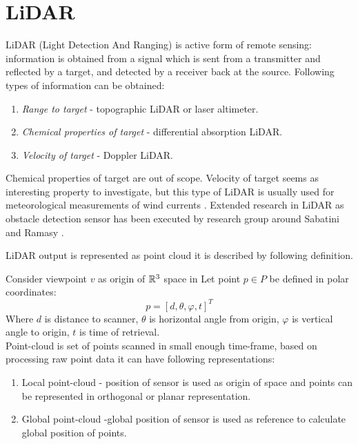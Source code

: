 \section{LiDAR}
\noindent LiDAR (Light Detection And Ranging) is active form of remote sensing: information is obtained from a signal which is sent from a transmitter and reflected by a target, and detected by a receiver back at the source. Following types of information can be obtained:
\begin{enumerate}
\item \textit{Range to target} - topographic LiDAR or laser altimeter.
\item \textit{Chemical properties of target} - differential absorption LiDAR.
\item \textit{Velocity of target} - Doppler LiDAR.
\end{enumerate}

\noindent Chemical properties of target are out of scope. Velocity of  target seems as interesting property to investigate, but this type of LiDAR is usually used for meteorological measurements of wind currents \cite{martin2011meteorological}. Extended research in LiDAR as obstacle detection sensor has been executed by research group around Sabatini \cite{sabatini2014lidar} and Ramasy \cite{ramasamy2016lidar}. 

LiDAR output is represented as point cloud it is described by following definition.
\begin{definition}
Consider viewpoint $v$ as origin of $\mathbb{R}^3$ space in 
Let point $p \in P$ be defined in polar coordinates:
\begin{equation}
    p= [ d, \theta, \varphi, t ]^T
\end{equation}
Where $d$ is distance to scanner, $\theta$ is horizontal angle from origin, $\varphi$ is vertical angle to origin, $t$ is time of retrieval.\\

\noindent Point-cloud is set of points scanned in small enough time-frame, based on processing raw point data it can have following representations:
\begin{enumerate}
\item Local point-cloud - position of sensor is used as origin of space and points can be represented in orthogonal or planar representation. 
\item Global point-cloud -global position of sensor is used as reference to calculate global position of points.
\end{enumerate}
\end{definition}

